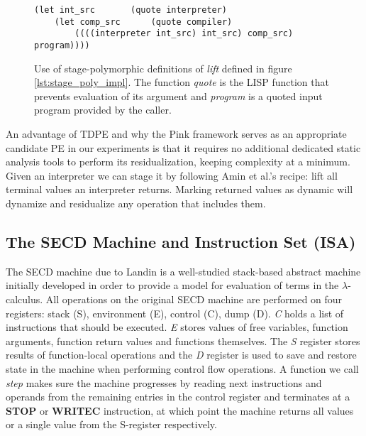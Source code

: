 \documentclass[a4paper,12pt,twoside,openright]{report}
\theoremstyle{definition}
\begin{document}
\begin{figure}
    \centering
    \begin{verbatim}
(let int_src       (quote interpreter)
    (let comp_src      (quote compiler)
        ((((interpreter int_src) int_src) comp_src) program))))
    \end{verbatim}
    \caption{Use of stage-polymorphic definitions of \textit{lift} defined in figure \ref{lst:stage_poly_impl}. The function \textit{quote} is the LISP function that prevents evaluation of its argument and \textit{program} is a quoted input program provided by the caller.}
    \label{lst:stage_poly_ex}
\end{figure}

An advantage of TDPE and why the Pink framework serves as an appropriate candidate PE in our experiments is that it requires no additional dedicated static analysis tools to perform its residualization, keeping complexity at a minimum. Given an interpreter we can stage it by following Amin et al.'s \cite{amin2017collapsing} recipe: lift all terminal values an interpreter returns. Marking returned values as dynamic will dynamize and residualize any operation that includes them.

\subsection{The SECD Machine and Instruction Set (ISA)}
The SECD machine due to Landin \cite{landin1964mechanical} is a well-studied stack-based abstract machine initially developed in order to provide a model for evaluation of terms in the $\lambda$-calculus. All operations on the original SECD machine are performed on four registers: stack (S), environment (E), control (C), dump (D). \textit{C} holds a list of instructions that should be executed. \textit{E} stores values of free variables, function arguments, function return values and functions themselves. The \textit{S} register stores results of function-local operations and the \textit{D} register is used to save and restore state in the machine when performing control flow operations. A function we call \textit{step} makes sure the machine progresses by reading next instructions and operands from the remaining entries in the control register and terminates at a \textbf{STOP} or \textbf{WRITEC} instruction, at which point the machine returns all values or a single value from the S-register respectively.
\end{document}

